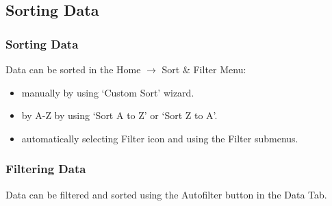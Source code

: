 \documentclass[12pt]{beamer}
\begin{document}
\subsection{Sorting Data}
	\begin{frame}
		\frametitle{Sorting Data}
		Data can be sorted in the Home $\rightarrow$ Sort \& Filter Menu:
		\begin{itemize}
			\item manually by using `Custom Sort' wizard.
			\item by A-Z by using `Sort A to Z' or `Sort Z to A'.
			\item automatically selecting Filter icon and using the Filter submenus. 
		\end{itemize}
	\end{frame}
	\begin{frame}
		\frametitle{Filtering Data}
		Data can be filtered and sorted using the Autofilter button in the Data Tab.
		
	\end{frame}
\end{document}
